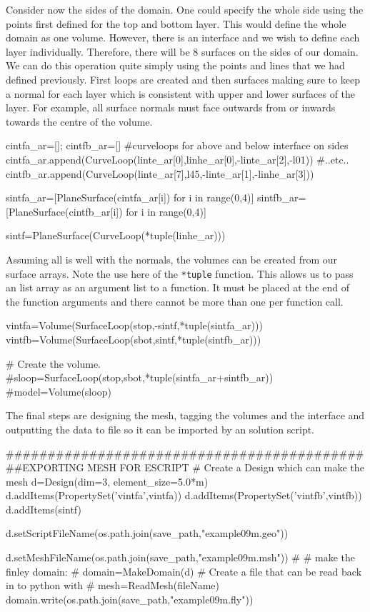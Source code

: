 Consider now the sides of the domain. One could specify the whole side using the
points first defined for the top and bottom layer. This would define the whole
domain as one volume. However, there is an interface and we wish to define each
layer individually. Therefore, there will be 8 surfaces on the sides of our
domain. We can do this operation quite simply using the points and lines that we
had defined previously. First loops are created and then surfaces making sure to
keep a normal for each layer which is consistent with upper and lower surfaces
of the layer. For example, all surface normals must face outwards from or
inwards towards the centre of the volume.
\begin{python}
cintfa_ar=[]; cintfb_ar=[] #curveloops for above and below interface on sides
cintfa_ar.append(CurveLoop(linte_ar[0],linhe_ar[0],-linte_ar[2],-l01))
#..etc..
cintfb_ar.append(CurveLoop(linte_ar[7],l45,-linte_ar[1],-linhe_ar[3]))

sintfa_ar=[PlaneSurface(cintfa_ar[i]) for i in range(0,4)]
sintfb_ar=[PlaneSurface(cintfb_ar[i]) for i in range(0,4)]

sintf=PlaneSurface(CurveLoop(*tuple(linhe_ar)))
\end{python}
Assuming all is well with the normals, the volumes can be created from our
surface arrays. Note the use here of the \verb!*tuple! function. This allows us
to pass an list array as an argument list to a function. It must be placed at
the end of the function arguments and there cannot be more than one per function
call.
\begin{python}
vintfa=Volume(SurfaceLoop(stop,-sintf,*tuple(sintfa_ar)))
vintfb=Volume(SurfaceLoop(sbot,sintf,*tuple(sintfb_ar)))

# Create the volume.
#sloop=SurfaceLoop(stop,sbot,*tuple(sintfa_ar+sintfb_ar))
#model=Volume(sloop)
\end{python}
The final steps are designing the mesh, tagging the volumes and the interface
and outputting the data to file so it can be imported by an \esc solution
script.
\begin{python}
#############################################EXPORTING MESH FOR ESCRIPT
# Create a Design which can make the mesh
d=Design(dim=3, element_size=5.0*m)
d.addItems(PropertySet('vintfa',vintfa))
d.addItems(PropertySet('vintfb',vintfb))
d.addItems(sintf)

d.setScriptFileName(os.path.join(save_path,"example09m.geo"))

d.setMeshFileName(os.path.join(save_path,"example09m.msh"))
#
#  make the finley domain:
#
domain=MakeDomain(d)
# Create a file that can be read back in to python with
# mesh=ReadMesh(fileName)
domain.write(os.path.join(save_path,"example09m.fly"))
\end{python}

